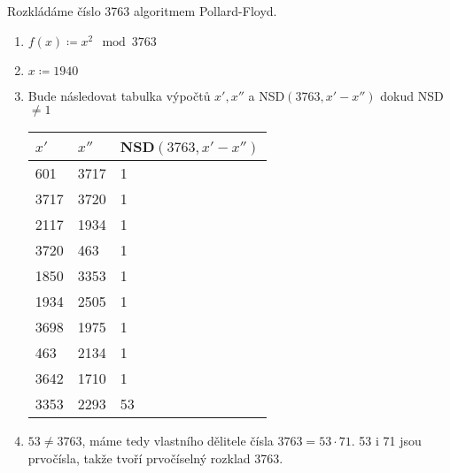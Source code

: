 \documentclass[12pt, a4paper]{article}
\begin{document}
Rozkládáme číslo 3763 algoritmem Pollard-Floyd.
\begin{enumerate}
\item $f(x) \coloneqq x^2 \mod 3763$
\item $x \coloneqq 1940$
\item Bude následovat tabulka výpočtů $x',x''$ a NSD$(3763, x'-x'')$ dokud NSD $\neq 1$ \\
\begin{table}[h]
\centering
\begin{tabular}{|l|l|l|}
\hline
$x'$ & $x''$ & NSD$(3763, x'-x'')$ \\ \hline
601 & 3717 & 1 \\ \hline
3717 & 3720 & 1 \\ \hline
2117 & 1934 & 1 \\ \hline
3720 & 463 & 1 \\ \hline
1850 & 3353 & 1 \\ \hline
1934 & 2505 & 1 \\ \hline
3698 & 1975 & 1 \\ \hline
463 & 2134 & 1 \\ \hline
3642 & 1710 & 1 \\ \hline
3353 & 2293 & 53 \\ \hline
\end{tabular}
\end{table}
\item $53 \neq 3763$, máme tedy vlastního dělitele čísla $3763 = 53 \cdot 71$. 
53 i 71 jsou prvočísla, takže tvoří prvočíselný rozklad 3763.
\end{enumerate}
\end{document}
